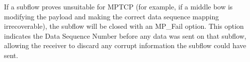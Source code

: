 If a subflow proves unsuitable for MPTCP (for example, if a middle bow is modifying the payload and making the correct data sequence mapping irrecoverable), the subflow will be closed with an MP\_Fail option. This option indicates the Data Sequence Number before any data was sent on that subflow, allowing the receiver to discard any corrupt information the subflow could have sent.
